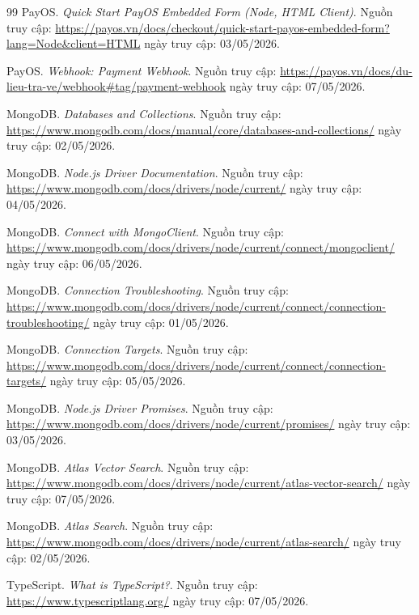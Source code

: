 \begin{thebibliography}{99}
PayOS. \textit{Quick Start PayOS Embedded Form (Node, HTML Client)}. 
Nguồn truy cập: \url{https://payos.vn/docs/checkout/quick-start-payos-embedded-form?lang=Node&client=HTML} ngày truy cập: 03/05/2026.

PayOS. \textit{Webhook: Payment Webhook}. 
Nguồn truy cập: \url{https://payos.vn/docs/du-lieu-tra-ve/webhook#tag/payment-webhook} ngày truy cập: 07/05/2026.

MongoDB. \textit{Databases and Collections}. 
Nguồn truy cập: \url{https://www.mongodb.com/docs/manual/core/databases-and-collections/} ngày truy cập: 02/05/2026.

MongoDB. \textit{Node.js Driver Documentation}. 
Nguồn truy cập: \url{https://www.mongodb.com/docs/drivers/node/current/} ngày truy cập: 04/05/2026.

MongoDB. \textit{Connect with MongoClient}. 
Nguồn truy cập: \url{https://www.mongodb.com/docs/drivers/node/current/connect/mongoclient/} ngày truy cập: 06/05/2026.

MongoDB. \textit{Connection Troubleshooting}. 
Nguồn truy cập: \url{https://www.mongodb.com/docs/drivers/node/current/connect/connection-troubleshooting/} ngày truy cập: 01/05/2026.

MongoDB. \textit{Connection Targets}. 
Nguồn truy cập: \url{https://www.mongodb.com/docs/drivers/node/current/connect/connection-targets/} ngày truy cập: 05/05/2026.

MongoDB. \textit{Node.js Driver Promises}. 
Nguồn truy cập: \url{https://www.mongodb.com/docs/drivers/node/current/promises/} ngày truy cập: 03/05/2026.

MongoDB. \textit{Atlas Vector Search}. 
Nguồn truy cập: \url{https://www.mongodb.com/docs/drivers/node/current/atlas-vector-search/} ngày truy cập: 07/05/2026.

MongoDB. \textit{Atlas Search}. 
Nguồn truy cập: \url{https://www.mongodb.com/docs/drivers/node/current/atlas-search/} ngày truy cập: 02/05/2026.

TypeScript. \textit{What is TypeScript?}. 
Nguồn truy cập: \url{https://www.typescriptlang.org/} ngày truy cập: 07/05/2026.


\end{thebibliography}
